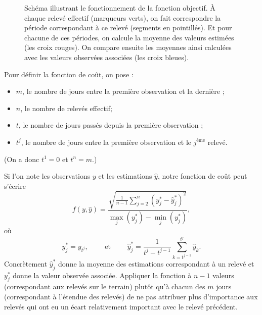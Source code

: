 \begin{figure}[ht]
\caption{Schéma illustrant le fonctionnement de la fonction objectif. À chaque relevé effectif (marqueurs verts), on fait correspondre la période correspondant à ce relevé (segments en pointillés).
Et pour chacune de ces périodes, on calcule la moyenne des valeurs estimées (les croix rouges). On compare ensuite les moyennes ainsi calculées avec les valeurs observées associées (les croix bleues).}
\label{fig:calib}
\end{figure}

Pour définir la fonction de coût, on pose :
\begin{itemize}
 \item $m$, le nombre de jours entre la première observation et la dernière ;
 \item $n$, le nombre de relevés effectif;
 \item $t$, le nombre de jours passés depuis la première observation ;
 \item $t^j$, le nombre de jours entre la première observation et le $j^{\text{ème}}$ relevé.
\end{itemize}
(On a donc $t^1 = 0$ et $t^n = m$.)

Si l'on note les observations $y$ et les estimations $\hat y$, notre fonction de coût peut s'écrire
$$
f(y, \hat y) = \frac{\sqrt{\frac{1}{n-1}\sum_{j=2}^n\left( y^*_j - \hat y^*_j \right)^2}}{\max_j(y^*_j) - \min_j(y^*_j)},
$$
où 
$$y^*_j =  y_{t^j}, \qquad \text{ et } \qquad \hat y^*_j = \frac{1}{t^j - t^{j-1}}\sum_{k=t^{j-1}}^{t^j} \hat y_k.$$
Concrètement $\hat y^*_j$ donne la moyenne des estimations correspondant à un relevé et $y^*_j$ donne la valeur observée associée.
Appliquer la fonction à $n-1$ valeurs (correspondant aux relevés sur le terrain) plutôt qu'à chacun des $m$ jours (correspondant à l'étendue des relevés) de ne pas attribuer plus d'importance aux relevés qui ont eu un écart relativement important avec le relevé précédent.




